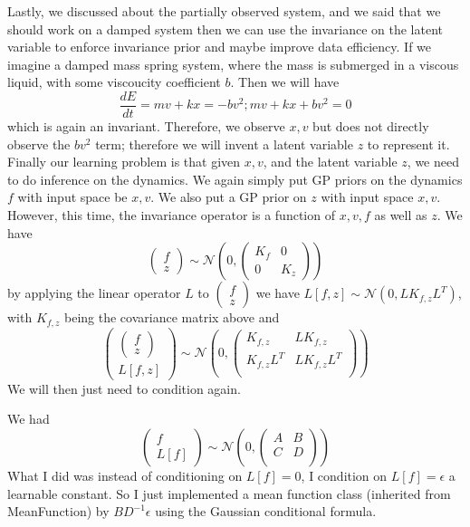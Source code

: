 \documentclass{article}
\begin{document}
Lastly, we discussed about the partially observed system, and we said that we should work on a damped system then we can use the invariance on the latent variable to enforce invariance prior and maybe improve data efficiency.
If we imagine a damped mass spring system, where the mass is submerged in a viscous liquid, with some viscoucity coefficient $b$. 
Then we will have 
$$
\frac{dE}{dt} = mv+kx = -bv^2; mv+kx+bv^2=0
$$
which is again an invariant. 
Therefore, we observe $x, v$ but does not directly observe the $bv^2$ term; therefore we will invent a latent variable $z$ to represent it.
Finally our learning problem is that given $x, v$, and the latent variable $z$, we need to do inference on the dynamics.
We again simply put GP priors on the dynamics $f$ with input space be $x, v$. 
We also put a GP prior on $z$ with input space $x, v$. 
However, this time, the invariance operator is a function of $x, v, f$ as well as $z$.
We have 
$$
\begin{pmatrix}
  f \\ z 
\end{pmatrix}
\sim \mathcal{N} \left(0, \begin{pmatrix}
K_f & 0 \\ 0 & K_z\end{pmatrix}\right)
$$
by applying the linear operator $L$ to $\begin{pmatrix}
  f \\ z 
\end{pmatrix}$
we have $L[f, z] \sim \mathcal{N} \left(0, LK_{f, z}L^T\right)$, with $K_{f,z}$ being the covariance matrix above and 
$$
\begin{pmatrix}
  \begin{pmatrix}
    f\\z
  \end{pmatrix} \\ L[f, z]
\end{pmatrix}
\sim \mathcal{N} \left(0, \begin{pmatrix}
K_{f,z} & LK_{f,z} \\ K_{f,z}L^T & LK_{f,z}L^T \\\end{pmatrix}\right)
$$
We will then just need to condition again.





We had 
$$\begin{pmatrix}
  f \\ L[f]
\end{pmatrix} \sim \mathcal{N} \left(0, \begin{pmatrix}
  A & B \\ C & D\\
\end{pmatrix}\right)$$
What I did was instead of conditioning on $L[f]=0$, I condition on $L[f]=\epsilon$ a learnable constant. 
So I just implemented a mean function class (inherited from MeanFunction) by $BD^{-1}\epsilon$ using the Gaussian conditional formula. 
\end{document}
